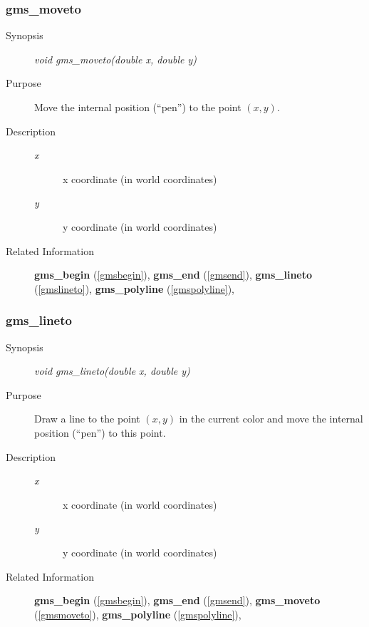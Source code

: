 \subsubsection{gms\_moveto\label{gmsmoveto}}
\begin{description}
\item[Synopsis]\mbox{}


{\em void    gms\_moveto(double x, double y)\/}
\item[Purpose]\mbox{}


Move the internal position (``pen'') to the point $(x,y)$.
\item[Description]\mbox{}


\begin{description}
\item[{\em x\/}]\mbox{}

 x coordinate (in world coordinates)
\item[{\em y\/}]\mbox{}

 y coordinate (in world coordinates)
\end{description}

\item[Related Information]\mbox{}


{\bf gms\_begin} (\ref{gmsbegin}), 
{\bf gms\_end} (\ref{gmsend}), 
{\bf gms\_lineto} (\ref{gmslineto}), 
{\bf gms\_polyline} (\ref{gmspolyline}), 
\end{description}


\newpage



\subsubsection{gms\_lineto\label{gmslineto}}
\begin{description}
\item[Synopsis]\mbox{}


{\em void    gms\_lineto(double x, double y)\/}
\item[Purpose]\mbox{}


Draw a line to the point $(x,y)$ in the  current color and
move the internal position (``pen'') to this point.
\item[Description]\mbox{}


\begin{description}
\item[{\em x\/}]\mbox{}

 x coordinate (in world coordinates)
\item[{\em y\/}]\mbox{}

 y coordinate (in world coordinates)
\end{description}

\item[Related Information]\mbox{}


{\bf gms\_begin} (\ref{gmsbegin}), 
{\bf gms\_end} (\ref{gmsend}), 
{\bf gms\_moveto} (\ref{gmsmoveto}), 
{\bf gms\_polyline} (\ref{gmspolyline}), 
\end{description}





